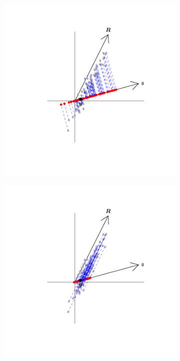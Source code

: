 \documentclass[12pt]{article}
\theoremstyle{definition}
\begin{document}
\begin{figure}[H]
\begin{subfigure}[!h]{0.48\textwidth}
        \caption{}
    \end{subfigure}
    \begin{subfigure}[!h]{0.48\textwidth}
        \includegraphics[width=\textwidth]{Figs/OrthProj_George.pdf}
        \caption{}
    \end{subfigure}    \begin{subfigure}[!h]{0.48\textwidth}
        \includegraphics[width=\textwidth]{Figs/ObliqProj_George.pdf}

\end{subfigure}
\end{figure}
\end{document}
